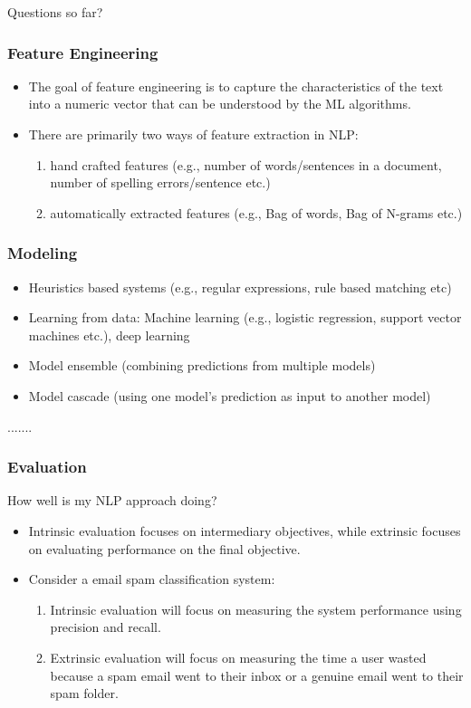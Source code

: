 \documentclass{beamer}
\begin{document}
\begin{frame}
    \Large Questions so far?
\end{frame}

\begin{frame}
\frametitle{Feature Engineering}
\begin{itemize}
    \item The goal of feature engineering is to capture the characteristics of the text into a numeric vector that can be understood by the ML algorithms.
    \item There are primarily two ways of feature extraction in NLP:
    \begin{enumerate}
        \item  hand crafted features (e.g., number of words/sentences in a document, number of spelling errors/sentence etc.)
        \item automatically extracted features (e.g., Bag of words, Bag of N-grams etc.)
    \end{enumerate}
\end{itemize}
\end{frame}

\begin{frame}
\frametitle{Modeling}
\begin{itemize}
    \item Heuristics based systems (e.g., regular expressions, rule based matching etc)
    \item Learning from data: Machine learning (e.g., logistic regression, support vector machines etc.), deep learning
\item Model ensemble (combining predictions from multiple models)
\item Model cascade (using one model's prediction as input to another model)
\end{itemize}
.......
\end{frame}

\begin{frame}
\frametitle{Evaluation}
How well is my NLP approach doing?
\begin{itemize}
    \item Intrinsic evaluation focuses on intermediary objectives, while extrinsic focuses on evaluating performance on the final objective. \pause
    \item Consider a email spam classification system:
  \begin{enumerate}
      \item Intrinsic evaluation will focus on measuring the system performance using precision and recall. 
      \pause \item Extrinsic evaluation will focus on measuring the time a user wasted because a spam email went to their inbox or a genuine email went to their spam folder.
  \end{enumerate}
\end{itemize}
\end{frame}
\end{document}
